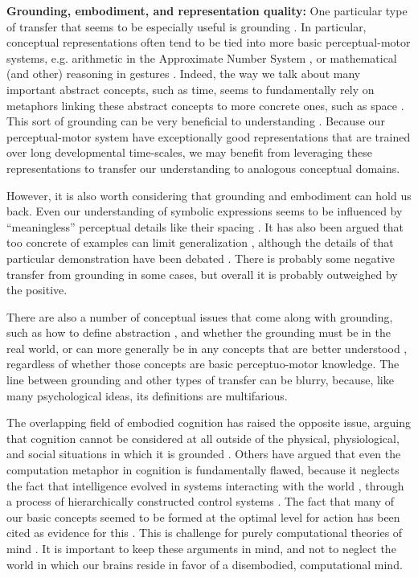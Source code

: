 \textbf{Grounding, embodiment, and representation quality:} One particular type of transfer that seems to be especially useful is grounding \citep{Barsalou2007}. In particular, conceptual representations often tend to be tied into more basic perceptual-motor systems, e.g. arithmetic in the Approximate Number System \citep{Park2013}, or mathematical (and other) reasoning in gestures \citep{Goldin-Meadow1993, Goldin-Meadow1999}. Indeed, the way we talk about many important abstract concepts, such as time, seems to fundamentally rely on metaphors linking these abstract concepts to more concrete ones, such as space \citep{Lakoff1980}. This sort of grounding can be very beneficial to understanding \citep{Nathan2008, Schwartz2015, Wakefield2018}. Because our perceptual-motor system have exceptionally good representations that are trained over long developmental time-scales, we may benefit from leveraging these representations to transfer our understanding to analogous conceptual domains. \par 
However, it is also worth considering that grounding and embodiment can hold us back. Even our understanding of symbolic expressions seems to be influenced by ``meaningless'' perceptual details like their spacing \citep{Landy2007}. It has also been argued that too concrete of examples can limit generalization \citep{Kaminski2008}, although the details of that particular demonstration have been debated \citep{DeBock2011, Lampinen2017b}. There is probably some negative transfer from grounding in some cases, but overall it is probably outweighed by the positive. \par
There are also a number of conceptual issues that come along with grounding, such as how to define abstraction \citep{Dove2016}, and whether the grounding must be in the real world, or can more generally be in any concepts that are better understood \citep{Wilensky1991}, regardless of whether those concepts are basic perceptuo-motor knowledge. The line between grounding and other types of transfer can be blurry, because, like many psychological ideas, its definitions are multifarious. \par 
The overlapping field of embodied cognition has raised the opposite issue, arguing that cognition cannot be considered at all outside of the physical, physiological, and social situations in which it is grounded \citep{Anderson2003}. Others have argued that even the computation metaphor in cognition is fundamentally flawed, because it neglects the fact that intelligence evolved in systems interacting with the world \citep{Cisek1999}, through a process of hierarchically constructed control systems \citep{Cisek2019}. The fact that many of our basic concepts seemed to be formed at the optimal level for action \citep{Rosch1976} has been cited as evidence for this \citep{Lakoff1999}. This is challenge for purely computational theories of mind \citep{fodor2001mind}. It is important to keep these arguments in mind, and not to neglect the world in which our brains reside in favor of a disembodied, computational mind. \par

